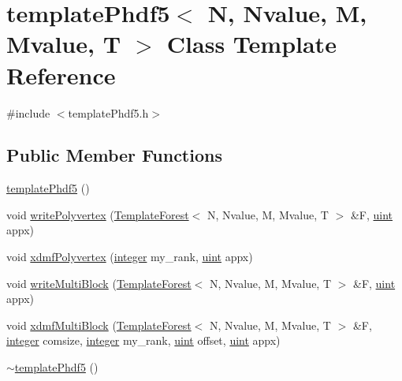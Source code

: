 \hypertarget{classtemplatePhdf5}{}\section{template\+Phdf5$<$ N, Nvalue, M, Mvalue, T $>$ Class Template Reference}
\label{classtemplatePhdf5}


{\ttfamily \#include $<$template\+Phdf5.\+h$>$}

\subsection*{Public Member Functions}
\begin{DoxyCompactItemize}
\item 
\mbox{\hyperlink{classtemplatePhdf5_a3b4cd745e1421e2fe9fbb91de266984a}{template\+Phdf5}} ()
\item 
void \mbox{\hyperlink{classtemplatePhdf5_a9c8c901d7a7472682a65678668f9d748}{write\+Polyvertex}} (\mbox{\hyperlink{classTemplateForest}{Template\+Forest}}$<$ N, Nvalue, M, Mvalue, T $>$ \&F, \mbox{\hyperlink{definitions_8h_a69aa29b598b851b0640aa225a9e5d61d}{uint}} appx)
\item 
void \mbox{\hyperlink{classtemplatePhdf5_ac6518d18bef649156b76f4f2871801e7}{xdmf\+Polyvertex}} (\mbox{\hyperlink{definitions_8h_adbd822dbdb8152553a0f77b84915bd8d}{integer}} my\+\_\+rank, \mbox{\hyperlink{definitions_8h_a69aa29b598b851b0640aa225a9e5d61d}{uint}} appx)
\item 
void \mbox{\hyperlink{classtemplatePhdf5_ad51ba0f27b82620be3bcc6c1e863ba6c}{write\+Multi\+Block}} (\mbox{\hyperlink{classTemplateForest}{Template\+Forest}}$<$ N, Nvalue, M, Mvalue, T $>$ \&F, \mbox{\hyperlink{definitions_8h_a69aa29b598b851b0640aa225a9e5d61d}{uint}} appx)
\item 
void \mbox{\hyperlink{classtemplatePhdf5_abf49ff7a33f6c843a145cebe64ea32bc}{xdmf\+Multi\+Block}} (\mbox{\hyperlink{classTemplateForest}{Template\+Forest}}$<$ N, Nvalue, M, Mvalue, T $>$ \&F, \mbox{\hyperlink{definitions_8h_adbd822dbdb8152553a0f77b84915bd8d}{integer}} comsize, \mbox{\hyperlink{definitions_8h_adbd822dbdb8152553a0f77b84915bd8d}{integer}} my\+\_\+rank, \mbox{\hyperlink{definitions_8h_a69aa29b598b851b0640aa225a9e5d61d}{uint}} offset, \mbox{\hyperlink{definitions_8h_a69aa29b598b851b0640aa225a9e5d61d}{uint}} appx)
\item 
\mbox{\hyperlink{classtemplatePhdf5_ac84ebe1ccff193434ab13172e69b338a}{$\sim$template\+Phdf5}} ()
\end{DoxyCompactItemize}
